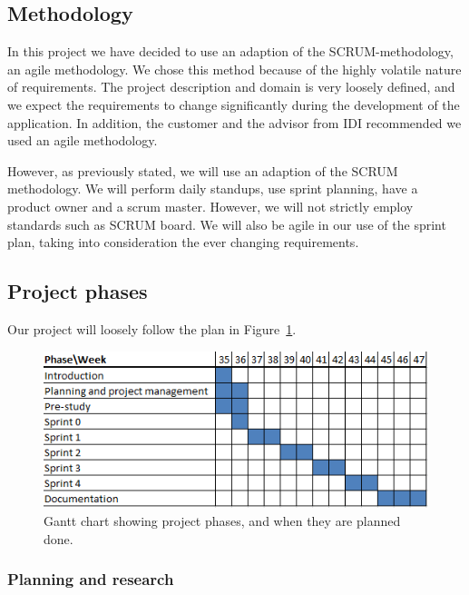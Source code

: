 \subsection{Methodology}

In this project we have decided to use an adaption of the SCRUM-methodology, an
agile methodology. We chose this method because of the highly volatile nature
of requirements. The project description and domain is very loosely defined,
and we expect the requirements to change significantly during the development
of the application. In addition, the customer and the advisor from IDI
recommended we used an agile methodology.

However, as previously stated, we will use an adaption of the SCRUM
methodology. We will perform daily standups, use sprint planning, have a
product owner and a scrum master. However, we will not strictly employ
standards such as SCRUM board. We will also be agile in our use of the sprint
plan, taking into consideration the ever changing requirements.


\subsection{Project phases}

Our project will loosely follow the plan in Figure~\ref{gantt:project}.

\begin{figure}[h]
\centering
  \includegraphics{project_management/project_effort_estimation}
  \caption[Gantt chart of project phases]{Gantt chart showing project phases, and when they are planned done.}
  \label{gantt:project}
\end{figure}

\subsubsection{Planning and research}

